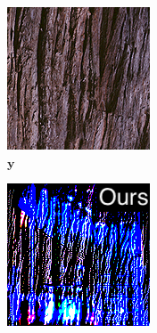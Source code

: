 \begin{figure}[]
\begin{subfigure}{\textwidth}
        \begin{subfigure}{0.19\textwidth}
            \centering
            \includegraphics[width=\textwidth]{images/04-experiment03/staircase_wood_target.jpg}
            \caption{\(\bm{y}\)}
            \label{fig:ex03-staircase_illum-wood-target}
        \end{subfigure}
        \hfill
        \begin{subfigure}{0.19\textwidth}
            \centering
            \includegraphics[width=\textwidth]{images/04-experiment03/staircase_illum/wood/stats_im_label.jpg}

\end{subfigure}
\end{subfigure}
\end{figure}
